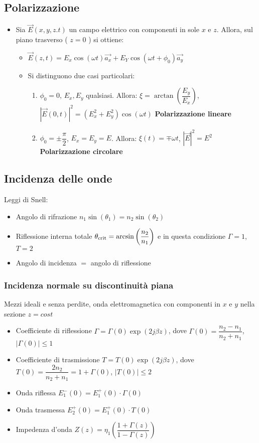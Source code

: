 \documentclass{article}
\begin{document}
\subsection{Polarizzazione}
\begin{itemize}
	\item Sia \( \vec{E}(x, y, z. t) \) un campo elettrico con componenti in sole \( x \) e \( z \). Allora, sul piano trasverso ( \( z = 0 \) ) si ottiene:
	\begin{itemize}
		\item \( \vec{E}(z, t) = E_x \cos ( \omega t) \vec{a_x} + E_Y \cos( \omega t + \phi_0) \vec{a_y}  \)
		\item Si distinguono due casi particolari:
		\begin{enumerate}
			\item \( \phi_0 = 0 \), \( E_x, E_y \) qualsiasi. Allora: \( \xi  = \arctan\left(\dfrac{E_y}{E_x}\right) \), \( |\vec{E}(0, t)|^2 = (E_x^2 + E_y^2) \cos(\omega t) \) \textbf{Polarizzazione lineare}
			\item  \( \phi_0 = \pm \dfrac{\pi}{2} \), \( E_x = E_y = E \). Allora: \( \xi(t)  = \mp \omega t \), \( |\vec{E}|^2 = E^2 \) \textbf{Polarizzazione circolare}
		\end{enumerate}
	\end{itemize}	  
\end{itemize}

\subsection{Incidenza delle onde}
Leggi di Snell:
\begin{itemize}
	\item Angolo di rifrazione \(n_1 \sin(\theta_1) = n_2 \sin(\theta_2) \)
	\item Riflessione interna totale \(\theta_{\textnormal{crit}} = \arcsin\left( \dfrac{n_2}{n_1} \right) \) e in questa condizione \(\Gamma = 1\), \(T = 2\)
	\item Angolo di incidenza \(=\) angolo di riflessione
\end{itemize}
\subsubsection{Incidenza normale su discontinuità piana}
Mezzi ideali e senza perdite, onda elettromagnetica con componenti in \( x \) e \( y \) nella sezione \( z = cost \)
\begin{itemize}
	\item Coefficiente di riflessione \( \Gamma = \Gamma(0) \exp(2 j \beta z)  \), dove \( \Gamma(0) = \dfrac{n_2 - n_1}{n_2 + n_1}\), \( | \Gamma(0) | \leq 1 \)
	\item Coefficiente di trasmissione \( T = T(0) \exp(2 j \beta z)  \), dove \( T(0) = \dfrac{2 n_2}{n_2 + n_1} = 1 + \Gamma(0)\), \( | T(0) | \leq 2 \)
	\item Onda riflessa \( E_1^-(0) =  E_1^+(0) \cdot \Gamma (0) \)
	\item Onda trasmessa \( E_2^+(0) =  E_1^+(0) \cdot T (0) \)
	\item Impedenza d'onda \( Z(z) = \eta_1 \left(\dfrac{1 + \Gamma(z)}{1 - \Gamma(z)}\right) \)
\end{itemize}
\end{document}
